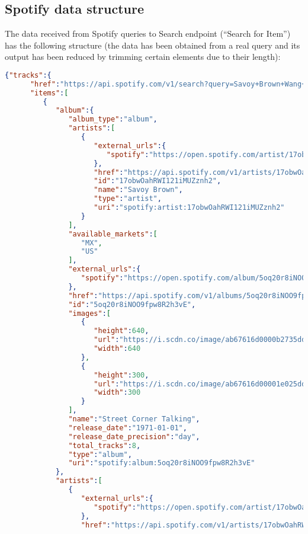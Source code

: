 \subsection{Spotify data structure}
\nonzeroparskip The data received from Spotify queries to Search endpoint (``Search for Item'') has the following structure (the data has been obtained from a real query and its output has been reduced by trimming certain elements due to their length):
\begin{lstlisting}[language=json,firstnumber=1]
{"tracks":{
      "href":"https://api.spotify.com/v1/search?query=Savoy+Brown+Wang+Dang+Doodle+&type=track&offset=0&limit=1",
      "items":[
         {
            "album":{
               "album_type":"album",
               "artists":[
                  {
                     "external_urls":{
                        "spotify":"https://open.spotify.com/artist/17obwOahRWI121iMUZznh2"
                     },
                     "href":"https://api.spotify.com/v1/artists/17obwOahRWI121iMUZznh2",
                     "id":"17obwOahRWI121iMUZznh2",
                     "name":"Savoy Brown",
                     "type":"artist",
                     "uri":"spotify:artist:17obwOahRWI121iMUZznh2"
                  }
               ],
               "available_markets":[
                  "MX",
                  "US"
               ],
               "external_urls":{
                  "spotify":"https://open.spotify.com/album/5oq20r8iNOO9fpw8R2h3vE"
               },
               "href":"https://api.spotify.com/v1/albums/5oq20r8iNOO9fpw8R2h3vE",
               "id":"5oq20r8iNOO9fpw8R2h3vE",
               "images":[
                  {
                     "height":640,
                     "url":"https://i.scdn.co/image/ab67616d0000b2735dd44bf0a252e30d4bb2e7c8",
                     "width":640
                  },
                  {
                     "height":300,
                     "url":"https://i.scdn.co/image/ab67616d00001e025dd44bf0a252e30d4bb2e7c8",
                     "width":300
                  }
               ],
               "name":"Street Corner Talking",
               "release_date":"1971-01-01",
               "release_date_precision":"day",
               "total_tracks":8,
               "type":"album",
               "uri":"spotify:album:5oq20r8iNOO9fpw8R2h3vE"
            },
            "artists":[
               {
                  "external_urls":{
                     "spotify":"https://open.spotify.com/artist/17obwOahRWI121iMUZznh2"
                  },
                  "href":"https://api.spotify.com/v1/artists/17obwOahRWI121iMUZznh2",

\end{lstlisting}
